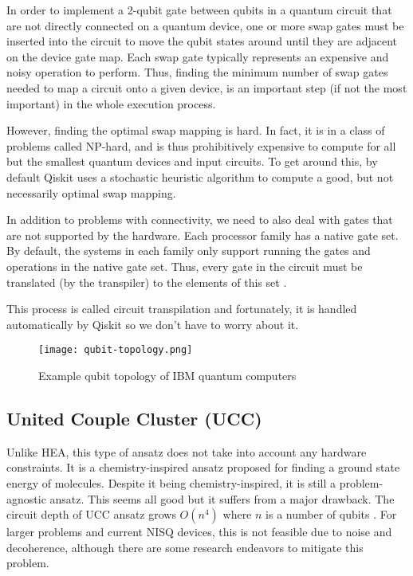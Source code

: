 In order to implement a 2-qubit gate between qubits in a quantum circuit that are not directly connected on a quantum device, one or more swap gates must be inserted into the circuit to move the qubit states around until they are adjacent on the device gate map. Each swap gate typically represents an expensive and noisy operation to perform. Thus, finding the minimum number of swap gates needed to map a circuit onto a given device, is an important step (if not the most important) in the whole execution process.~\cite{transpiler}

However, finding the optimal swap mapping is hard. In fact, it is in a class of problems called NP-hard, and is thus prohibitively expensive to compute for all but the smallest quantum devices and input circuits. To get around this, by default Qiskit uses a stochastic heuristic algorithm to compute a good, but not necessarily optimal swap mapping.~\cite{transpiler} 

In addition to problems with connectivity, we need to also deal with gates that are not supported by the hardware. Each processor family has a native gate set. By default, the systems in each family only support running the gates and operations in the native gate set. Thus, every gate in the circuit must be translated (by the transpiler) to the elements of this set \cite{native_gates}.

This process is called circuit transpilation and fortunately, it is handled automatically by Qiskit so we don't have to worry about it. 
\begin{figure}[H]
    \texttt{[image: qubit-topology.png]}
    \caption{Example qubit topology of IBM quantum computers}
    \label{fig:qubit_topology}
\end{figure}



\subsection{United Couple Cluster (UCC)}
Unlike HEA, this type of ansatz does not take into account any hardware constraints. It is a chemistry-inspired ansatz proposed for finding a ground state energy of molecules. Despite it being chemistry-inspired, it is still a problem-agnostic ansatz. This seems all good but it suffers from a major drawback. The circuit depth of UCC ansatz grows $O(n^4)$ where $n$ is a number of qubits \cite{ucc_ansatz}. For larger problems and current NISQ devices, this is not feasible due to noise and decoherence, although there are some research endeavors to mitigate this problem.
  
